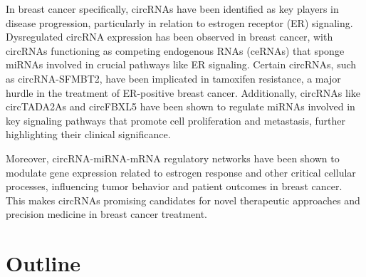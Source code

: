 In breast cancer specifically, circRNAs have been identified as key players in
disease progression, particularly in relation to estrogen receptor (ER)
signaling.
Dysregulated circRNA expression has been observed in breast cancer, with
circRNAs functioning as competing endogenous RNAs (ceRNAs) that sponge miRNAs
involved in crucial pathways like ER
signaling\supercite{nair_circular_2016,xu_circrna_2022}.
Certain circRNAs, such as circRNA-SFMBT2, have been implicated in tamoxifen
resistance, a major hurdle in the treatment of ER-positive breast
cancer\supercite{li_circrna-sfmbt2_2023}.
Additionally, circRNAs like circTADA2As and circFBXL5 have been shown to
regulate miRNAs involved in key signaling pathways that promote cell
proliferation and metastasis, further highlighting their clinical
significance\supercite{xu_circtada2as_2019,gao_hsa_circrna_0006528_2019}.

Moreover, circRNA-miRNA-mRNA regulatory networks have been shown to modulate
gene expression related to estrogen response and other critical cellular
processes, influencing tumor behavior and patient outcomes in breast
cancer\supercite{xu_circrna_2022,nair_circular_2016}.
This makes circRNAs promising candidates for novel therapeutic approaches and
precision medicine in breast cancer treatment.

\section{Outline}

